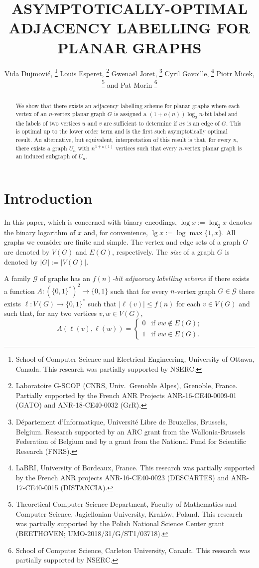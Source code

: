 \documentclass[kpfonts]{patmorin}
\title{\MakeUppercase{Asymptotically-Optimal Adjacency Labelling for Planar Graphs}}
\author{
  Vida Dujmović,%
    \thanks{School of Computer Science and Electrical Engineering, University of Ottawa, Canada. This research was partially supported by NSERC.}\quad
  Louis Esperet,%
    \thanks{Laboratoire G-SCOP (CNRS, Univ.\ Grenoble Alpes), Grenoble, France. Partially supported by the French ANR Projects ANR-16-CE40-0009-01 (GATO) and ANR-18-CE40-0032 (GrR).}\quad
  Gwenaël Joret,%
     \thanks{Département d'Informatique, Université Libre de Bruxelles, Brussels, Belgium. Research supported by an ARC grant from the Wallonia-Brussels Federation of Belgium and by a grant from the National Fund for Scientific Research (FNRS).}\quad
  Cyril Gavoille,%
    \thanks{LaBRI, University of Bordeaux, France. This research was partially supported by the French ANR projects ANR-16-CE40-0023 (DESCARTES) and ANR-17-CE40-0015 (DISTANCIA).}\quad
  Piotr Micek,%
    \thanks{Theoretical Computer Science Department, Faculty of Mathematics and Computer Science, Jagiellonian University, Krak\'{o}w, Poland. This research was partially supported by the Polish National Science Center grant (BEETHOVEN; UMO-2018/31/G/ST1/03718).}\newline
  and Pat Morin%
    \thanks{School of Computer Science, Carleton University, Canada. This research was partially supported by NSERC.}
}
\let\le\leqslant
\begin{document}
\begin{titlepage}
\maketitle

\begin{abstract}
  We show that there exists an adjacency labelling scheme for planar graphs where each vertex of an $n$-vertex planar graph $G$ is assigned a $(1+o(n))\log_2 n$-bit label and the labels of two vertices $u$ and $v$ are sufficient to determine if $uv$ is an edge of $G$.  This is optimal up to the lower order term and is the first such asymptotically optimal result.  An alternative, but equivalent, interpretation of this result is that, for every $n$, there exists a graph $U_n$ with $n^{1+o(1)}$ vertices such that every $n$-vertex planar graph is an induced subgraph of $U_n$.  
%  
\end{abstract}
\end{titlepage}
\tableofcontents

\newpage

\setcounter{page}{0}
\section{Introduction}

In this paper, which is concerned with binary encodings, $\log x:=\log_2 x$ denotes the binary logarithm of $x$ and, for convenience, $\lg x := \log\max\{1,x\}$.  All graphs we consider are finite and simple.  The vertex and edge sets of a graph $G$ are denoted by $V(G)$ and $E(G)$, respectively.  The \emph{size} of a graph $G$ is denoted by $|G|:=|V(G)|$.

A family $\mathcal{G}$ of graphs has an \emph{$f(n)$-bit adjacency labelling scheme} if there exists a function $A:(\{0,1\}^*)^2\to \{0,1\}$ such that for every $n$-vertex graph $G\in \mathcal{G}$ there exists $\ell:V(G)\to\{0,1\}^*$ such that $|\ell(v)|\le f(n)$ for each $v\in V(G)$ and such that, for any two vertices $v,w\in V(G)$,
\[  A(\ell(v),\ell(w)) = 
      \begin{cases} 
        0 & \text{if $vw\not\in E(G)$;} \\
        1 & \text{if $vw\in E(G)$.}
      \end{cases}
\]
\end{document}

